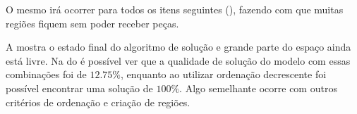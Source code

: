 

O mesmo irá ocorrer para todos os itens seguintes (), fazendo com que muitas
regiões fiquem sem poder receber peças.



A  mostra o estado final do algoritmo de solução e grande parte do espaço
ainda está livre.
Na  do  é possível ver que a qualidade de
solução do modelo com essas combinações foi de $12.75\%$, enquanto ao utilizar ordenação decrescente
foi possível encontrar uma solução de $100\%$.
Algo semelhante ocorre com outros critérios de ordenação e criação de regiões.



